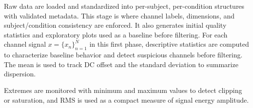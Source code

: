 Raw data are loaded and standardized into per-subject, per-condition structures with validated metadata. This stage is where channel labels, dimensions, and subject/condition consistency are enforced. It also generates initial quality statistics and exploratory plots used as a baseline before filtering.
For each channel signal $x=\{x_n\}_{n=1}^{N}$ in this first phase, descriptive statistics are computed to characterize baseline behavior and detect suspicious channels before filtering. The mean is used to track DC offset and the standard deviation to summarize dispersion.

Extremes are monitored with minimum and maximum values to detect clipping or saturation, and RMS is used as a compact measure of signal energy amplitude.

